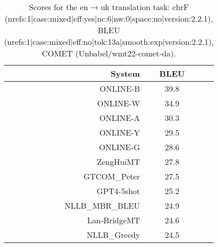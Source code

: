 \documentclass[11pt]{article}
\begin{document}
\begin{table}
\begin{subtable}[t]{0.33\textwidth}
\begin{tabular}{rcc}
\toprule 
System  & BLEU \\ 
\midrule 
\rowcolor{ashgrey} ONLINE-B  & 39.8 \\ 
\rowcolor{ashgrey} ONLINE-W  & 34.9 \\ 
\rowcolor{ashgrey} ONLINE-A  & 30.3 \\ 
\rowcolor{ashgrey} ONLINE-Y  & 29.5 \\ 
\rowcolor{ashgrey} ONLINE-G  & 28.6 \\ 
\rowcolor{ashgrey} ZengHuiMT  & 27.8 \\ 
\rowcolor{ashgrey} GTCOM\_Peter  & 27.5 \\ 
\rowcolor{ashgrey} GPT4-5shot  & 25.2 \\ 
\rowcolor{ashgrey} NLLB\_MBR\_BLEU  & 24.9 \\ 
\rowcolor{ashgrey} Lan-BridgeMT  & 24.6 \\ 
\rowcolor{ashgrey} NLLB\_Greedy  & 24.5 \\ 
\bottomrule 
\end{tabular} 
\end{subtable}  
\caption{Scores for the en$\rightarrow$uk translation task: chrF (nrefs:1|case:mixed|eff:yes|nc:6|nw:0|space:no|version:2.2.1), BLEU (nrefs:1|case:mixed|eff:no|tok:13a|smooth:exp|version:2.2.1), COMET (Unbabel/wmt22-comet-da).} 
\end{table} 
\end{document}
